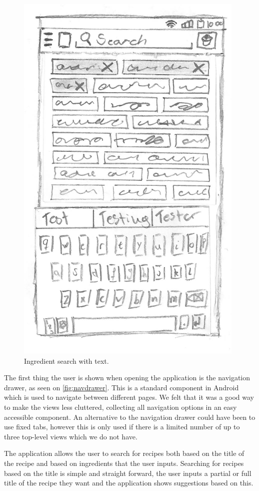 \begin{figure}[H]
\begin{minipage}[b]{0.5\columnwidth}
\includegraphics[width=0.7\columnwidth]{img/prototypes/ingredient_search_text.pdf}
\caption{Ingredient search with text\label{fig:ingretext}.}
\end{minipage}
\end{figure}

The first thing the user is shown when opening the application is the navigation drawer, as seen on \autoref{fig:navdrawer}. This is a standard component in Android which is used to navigate between different pages\cite{guidelines-navigationdrawer}. We felt that it was a good way to make the views less cluttered, collecting all navigation options in an easy accessible component. An alternative to the navigation drawer could have been to use fixed tabs, however this is only used if there is a limited number of up to three top-level views which we do not have\cite{guidelines-appstructure}.

The application allows the user to search for recipes both based on the title of the recipe and based on ingredients that the user inputs. Searching for recipes based on the title is simple and straight forward, the user inputs a partial or full title of the recipe they want and the application shows suggestions based on this. 


